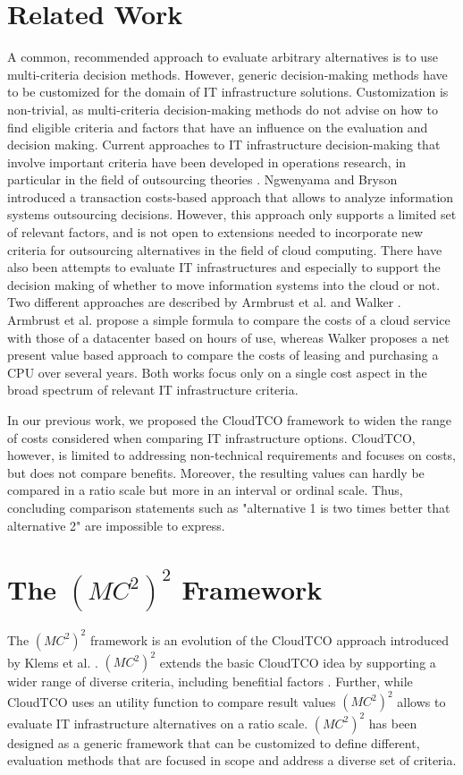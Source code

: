 \documentclass[journal,final,a4paper,twoside]{IEEEtran}
\begin{document}
\section{Related Work}
\label{relatedWork}
A common, recommended approach to evaluate arbitrary alternatives is to use multi-criteria decision methods. However, generic decision-making methods have to be customized for the domain of IT infrastructure solutions. Customization is non-trivial, as multi-criteria decision-making methods do not advise on how to find eligible criteria and factors that have an influence on the evaluation and decision making.
Current approaches to IT infrastructure decision-making that involve important criteria have been developed in operations research, in particular in the field of outsourcing theories \cite{lacity1993information}. Ngwenyama and Bryson \cite{ngwenyama1999making} introduced a transaction costs-based approach that allows to analyze information systems outsourcing decisions. However, this approach only supports a limited set of relevant factors, and is not open to extensions needed  to incorporate new criteria for outsourcing alternatives in the field of cloud computing. There have also been attempts to evaluate IT infrastructures and especially to support the decision making of whether to move information systems into the cloud or not. Two different approaches are described by Armbrust et al. \cite{armbrust2009above} and Walker \cite{10.1109/MC.2009.135}. Armbrust et al. propose a simple formula to compare the costs of a cloud service with those of a datacenter based on hours of use, whereas Walker proposes a net present value based approach to compare the costs of leasing and purchasing a CPU over several years. Both works focus only on a single cost aspect in the broad spectrum of relevant IT infrastructure criteria.

In our previous work, we proposed the CloudTCO framework \cite{klems2008dccaffetvocc} to widen the range of costs considered when comparing IT infrastructure options. CloudTCO, however, is limited to addressing non-technical requirements and focuses on costs, but does not compare benefits. Moreover, the resulting values can hardly be compared in a ratio scale but more in an interval or ordinal scale. Thus, concluding comparison statements such as "alternative 1 is two times better that alternative 2" are impossible to express.





\section{The $(MC^2)^2$ Framework}
\label{mc22framework}
The $(MC^2)^2$ framework is an evolution of the CloudTCO approach introduced by Klems et al. \cite{klems2008dccaffetvocc}. $(MC^2)^2$ extends the basic CloudTCO idea by supporting a wider range of diverse criteria, including benefitial factors . Further, while CloudTCO uses an utility function to compare result values $(MC^2)^2$ allows to evaluate IT infrastructure alternatives on a ratio scale. $(MC^2)^2$ has been designed as a generic framework that can be customized to define different, evaluation methods that are focused in scope and address a diverse set of criteria.
\end{document}
